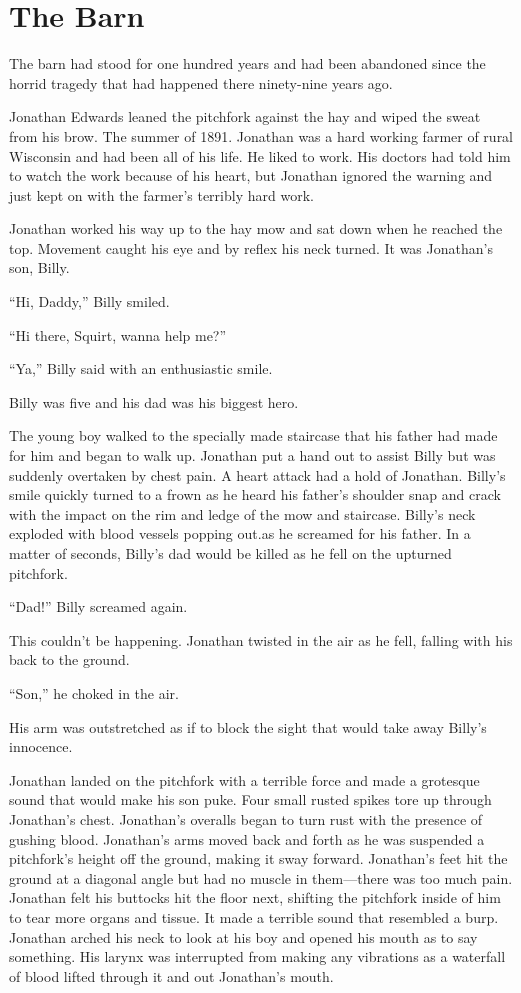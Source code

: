 \chapter{The Barn}

The barn had stood for one hundred years and had been abandoned since
the horrid tragedy that had happened there ninety-nine years ago.

Jonathan Edwards leaned the pitchfork against the hay and wiped the
sweat from his brow. The summer of 1891. Jonathan was a hard working
farmer of rural Wisconsin and had been all of his life. He liked to
work. His doctors had told him to watch the work because of his heart,
but Jonathan ignored the warning and just kept on with the farmer's
terribly hard work.

Jonathan worked his way up to the hay mow and sat down when he reached
the top. Movement caught his eye and by reflex his neck turned. It was
Jonathan's son, Billy.

``Hi, Daddy,'' Billy smiled.

``Hi there, Squirt, wanna help me?''

``Ya,'' Billy said with an enthusiastic smile.

Billy was five and his dad was his biggest hero.

The young boy walked to the specially made staircase that his father had
made for him and began to walk up. Jonathan put a hand out to assist
Billy but was suddenly overtaken by chest pain. A heart attack had a
hold of Jonathan. Billy's smile quickly turned to a frown as he heard
his father's shoulder snap and crack with the impact on the rim and
ledge of the mow and staircase. Billy's neck exploded with blood vessels
popping out.as he screamed for his father. In a matter of seconds,
Billy's dad would be killed as he fell on the upturned pitchfork.

``Dad!'' Billy screamed again.

This couldn't be happening. Jonathan twisted in the air as he fell,
falling with his back to the ground.

``Son,'' he choked in the air.

His arm was outstretched as if to block the sight that would take away
Billy's innocence.

Jonathan landed on the pitchfork with a terrible force and made a
grotesque sound that would make his son puke. Four small rusted spikes
tore up through Jonathan's chest. Jonathan's overalls began to turn rust
with the presence of gushing blood. Jonathan's arms moved back and forth
as he was suspended a pitchfork's height off the ground, making it sway
forward. Jonathan's feet hit the ground at a diagonal angle but had no
muscle in them---there was too much pain. Jonathan felt his buttocks hit
the floor next, shifting the pitchfork inside of him to tear more organs
and tissue. It made a terrible sound that resembled a burp. Jonathan
arched his neck to look at his boy and opened his mouth as to say
something. His larynx was interrupted from making any vibrations as a
waterfall of blood lifted through it and out Jonathan's mouth.

